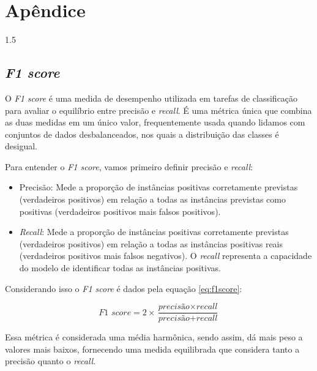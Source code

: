 \documentclass[a4paper,12pt,openright,oneside]{book}
\newenvironment{myenv}[1]
  {\begin{spacing}{#1}}
  {\end{spacing}}
\begin{document}
	\chapter{Apêndice}
	\begin{myenv}{1.5}
		\section{\textit{F1 score}}
		\label{sec:f1scoresec}
		\par O \textit{F1 score} é uma medida de desempenho utilizada em tarefas de classificação para avaliar o equilíbrio entre precisão e \textit{recall}. É uma métrica única que combina as duas medidas em um único valor, frequentemente usada quando lidamos com conjuntos de dados desbalanceados, nos quais a distribuição das classes é desigual.
		
		\par Para entender o \textit{F1 score}, vamos primeiro definir precisão e \textit{recall}:
		
		\begin{itemize}
			\item Precisão: Mede a proporção de instâncias positivas corretamente previstas (verdadeiros positivos) em relação a todas as instâncias previstas como positivas (verdadeiros positivos mais falsos positivos).
			
			\item \textit{Recall}: Mede a proporção de instâncias positivas corretamente previstas (verdadeiros positivos) em relação a todas as instâncias positivas reais (verdadeiros positivos mais falsos negativos). O \textit{recall} representa a capacidade do modelo de identificar todas as instâncias positivas.
		\end{itemize}
		
		\par Considerando isso o \textit{F1 score} é dados pela equação \ref{eq:f1score}:
		
		\begin{equation}
			\label{eq:f1score}
			\textit{F1 score} = 2 \times \frac{\textit{precisão} \times \textit{recall}}{\textit{precisão} + 	\textit{recall}}
		\end{equation}
		
		\par Essa métrica é considerada uma média harmônica, sendo assim, dá mais peso a valores mais baixos, fornecendo uma medida equilibrada que considera tanto a precisão quanto o \textit{recall}.
	\end{myenv}














	
	
\end{document}
